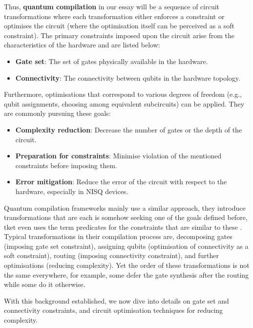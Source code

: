 Thus, \textbf{quantum compilation} in our essay will be a sequence of circuit transformations where each transformation either enforces a constraint or optimises the circuit (where the optimisation itself can be perceived as a soft constraint). The primary constraints imposed upon the circuit arise from the characteristics of the hardware and are listed below:

\begin{itemize}
  \item \textbf{Gate set}: The set of gates physically available in the hardware.
  \item \textbf{Connectivity}: The connectivity between qubits in the hardware topology.
\end{itemize}
  
Furthermore, optimisations that correspond to various degrees of freedom (e.g., qubit assignments, choosing among equivalent subcircuits) can be applied. They are commonly pursuing these goals:

\begin{itemize}
  \item \textbf{Complexity reduction}: Decrease the number of gates or the depth of the circuit.
  \item \textbf{Preparation for constraints}: Minimise violation of the mentioned constraints before imposing them.
  \item \textbf{Error mitigation}: Reduce the error of the circuit with respect to the hardware, especially in NISQ devices.
\end{itemize}

Quantum compilation frameworks mainly use a similar approach, they introduce transformations that are each is somehow seeking one of the goals defined before, tket even uses the term predicates for the constraints that are similar to these \cite{sivarajah2021}. Typical transformations in their compilation process are, decomposing gates (imposing gate set constraint), assigning qubits (optimisation of connectivity as a soft constraint), routing (imposing connectivity constraint), and further optimisations (reducing complexity). Yet the order of these transformations is not the same everywhere, for example, some \cite{lao2021,qiskit2023} defer the gate synthesis after the routing while some \cite{wille2020,sivarajah2021} do it otherwise.

With this background established, we now dive into details on gate set and connectivity constraints, and circuit optimisation techniques for reducing complexity.

